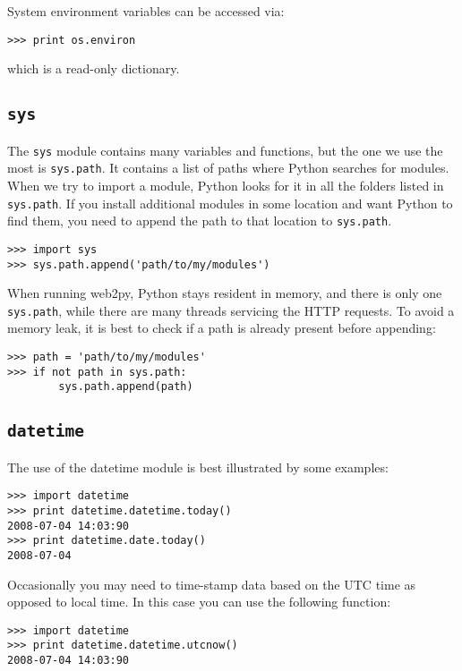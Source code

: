 \documentclass[justified,sixbynine,notoc]{tufte-book}
\def\ft{\small\tt}
\def\inxx#1{\index{#1}}
\begin{document}
\begin{fullwidth}
System environment variables can be accessed via:
\begin{lstlisting}
>>> print os.environ
\end{lstlisting}
\noindent which is a read-only dictionary.

\goodbreak\subsection{{\ft sys}}

\inxx{sys} \inxx{sys.path}

The {\ft sys} module contains many variables and functions, but the one we use the most is {\ft sys.path}. It contains a list of paths where Python searches for modules. When we try to import a module, Python looks for it in all the folders listed in {\ft sys.path}. If you install additional modules in some location and want Python to find them, you need to append the path to that location to {\ft sys.path}.
\begin{lstlisting}
>>> import sys
>>> sys.path.append('path/to/my/modules')
\end{lstlisting}

When running web2py, Python stays resident in memory, and there is only one {\ft sys.path}, while there are many threads servicing the HTTP requests. To avoid a memory leak, it is best to check if a path is already present before appending:
\begin{lstlisting}
>>> path = 'path/to/my/modules'
>>> if not path in sys.path:
        sys.path.append(path)
\end{lstlisting}

\goodbreak\subsection{{\ft datetime}}

\inxx{date} \inxx{datetime} \inxx{time}

The use of the datetime module is best illustrated by some examples:
\begin{lstlisting}
>>> import datetime
>>> print datetime.datetime.today()
2008-07-04 14:03:90
>>> print datetime.date.today()
2008-07-04
\end{lstlisting}

Occasionally you may need to time-stamp data based on the UTC time as opposed to local time. In this case you can use the following function:
\begin{lstlisting}
>>> import datetime
>>> print datetime.datetime.utcnow()
2008-07-04 14:03:90
\end{lstlisting}


\end{fullwidth}
\end{document}
